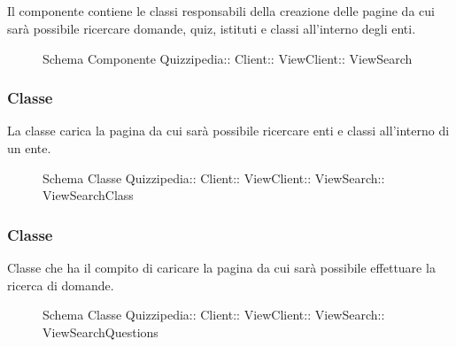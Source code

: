 \subsection{}
Il componente contiene le classi responsabili della creazione delle pagine da cui sarà possibile ricercare domande, quiz, istituti e classi all'interno degli enti.
\begin{figure}[H]
\centering
\noindent{}
\caption[Schema Componente Quizzipedia::Client::ViewClient::ViewSearch]{Schema Componente Quizzipedia:: Client:: ViewClient:: ViewSearch}
\end{figure}
\subsubsection{Classe }
La classe carica la pagina da cui sarà possibile ricercare enti e classi all'interno di un ente.
\begin{figure}[H]
\centering
\noindent{}
\caption[Schema Classe ViewSearchClass]{Schema Classe Quizzipedia:: Client:: ViewClient:: ViewSearch:: ViewSearchClass}
\end{figure}
\subsubsection{Classe }
Classe che ha il compito di caricare la pagina da cui sarà possibile effettuare la ricerca di domande.
\begin{figure}[H]
\centering
\noindent{}
\caption[Schema Classe ViewSearchQuestions]{Schema Classe Quizzipedia:: Client:: ViewClient:: ViewSearch:: ViewSearchQuestions}
\end{figure}
